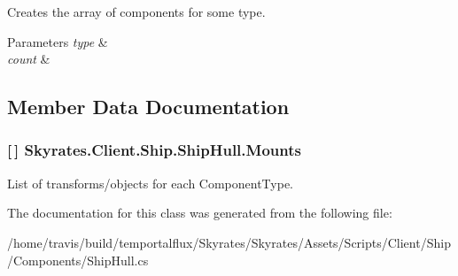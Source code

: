 Creates the array of components for some type. 


\begin{DoxyParams}{Parameters}
{\em type} & \\
\hline
{\em count} & \\
\hline
\end{DoxyParams}


\subsection{Member Data Documentation}
\hypertarget{class_skyrates_1_1_client_1_1_ship_1_1_ship_hull_ae4226c65a2653290aa04aa2b891585ce}{
\subsubsection[{Mounts}]{ \mbox{[}$\,$\mbox{]} Skyrates.\-Client.\-Ship.\-Ship\-Hull.\-Mounts}}\label{class_skyrates_1_1_client_1_1_ship_1_1_ship_hull_ae4226c65a2653290aa04aa2b891585ce}


List of transforms/objects for each Component\-Type. 



The documentation for this class was generated from the following file\-:\begin{DoxyCompactItemize}
\item 
/home/travis/build/temportalflux/\-Skyrates/\-Skyrates/\-Assets/\-Scripts/\-Client/\-Ship/\-Components/Ship\-Hull.\-cs\end{DoxyCompactItemize}

